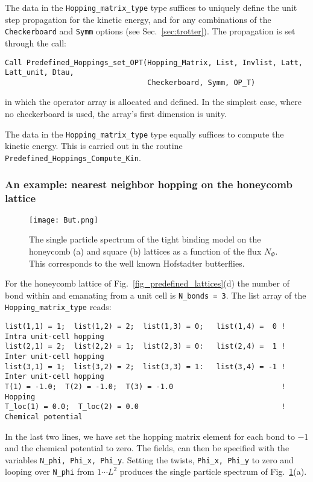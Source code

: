 The  data in the \texttt{Hopping\_matrix\_type} type suffices to uniquely define the  unit step propagation for the kinetic energy, and for  any combinations of the  \texttt{Checkerboard} and  \texttt{Symm}  options (see Sec.~\ref{sec:trotter}). The propagation is set through the call: 
\begin{lstlisting}[style=fortran]
Call Predefined_Hoppings_set_OPT(Hopping_Matrix, List, Invlist, Latt, Latt_unit, Dtau,
                                 Checkerboard, Symm, OP_T)
\end{lstlisting}
in which the operator array  is allocated and defined. In the simplest case, where no checkerboard is used, the array's first dimension is unity.


The   data in  the \texttt{Hopping\_matrix\_type} type   equally  suffices to compute  the kinetic energy.  This is carried out in the routine \texttt{Predefined\_Hoppings\_Compute\_Kin}.

\subsubsection{An example:   nearest neighbor hopping on the   honeycomb lattice }

\begin{figure}
	\begin{center}
		\texttt{[image: But.png]}
		\caption{The single particle spectrum  of the tight binding model on the  honeycomb  (a) and square (b) lattices as a function of the  flux  $N_\Phi$.    This corresponds to the well known  Hofstadter butterflies.  }
		\label{But.fig}
	\end{center}
\end{figure}

For the honeycomb lattice of  Fig.~\ref{fig_predefined_lattices}(d)   the number of  bond within and emanating from  a unit cell is \texttt{N\_bonds = 3}.     The list array of the \texttt{Hopping\_matrix\_type} reads:

\begin{lstlisting}[style=fortran,escapechar=\#]
list(1,1) = 1;  list(1,2) = 2;  list(1,3) = 0;   list(1,4) =  0 ! Intra unit-cell hopping
list(2,1) = 2;  list(2,2) = 1;  list(2,3) = 0:   list(2,4) =  1 ! Inter unit-cell hopping
list(3,1) = 1;  list(3,2) = 2;  list(3,3) = 1:   list(3,4) = -1 ! Inter unit-cell hopping
T(1) = -1.0;  T(2) = -1.0;  T(3) = -1.0                         ! Hopping
T_loc(1) = 0.0;  T_loc(2) = 0.0                                 ! Chemical potential 
\end{lstlisting} 
In the last two lines, we have set the hopping matrix element  for each bond to $-1$  and the chemical potential to zero.    The fields,   can then be specified   with the  variables   \texttt{N\_phi, Phi\_x, Phi\_y}.  Setting   the twists, 
\texttt{Phi\_x, Phi\_y}  to zero and  looping over \texttt{N\_phi}    from $ 1 \cdots L^2 $   produces  the single particle spectrum of  Fig.~\ref{But.fig}(a).  

